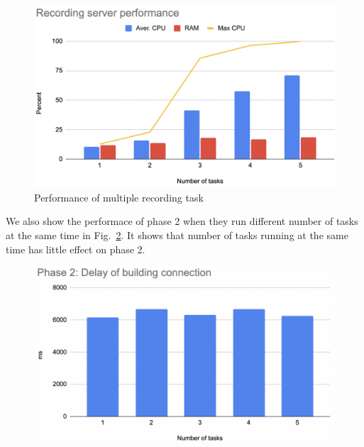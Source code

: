 \begin{figure}[H]
    \centering
    \includegraphics[width=\textwidth]{figsrc/result-scalability.png}
    \caption{Performance of multiple recording task\label{fig:result-scalability}}
\end{figure}

We also show the performace of phase 2 when they run different number of tasks at the same time in Fig.~\ref{fig:result-scale-2}. It shows that number of tasks running at the same time has little effect on phase 2. 

\begin{figure}[H]
    \centering
    \includegraphics[width=\textwidth]{figsrc/result-scale-2.png}
    \caption{\label{fig:result-scale-2}}
\end{figure}

